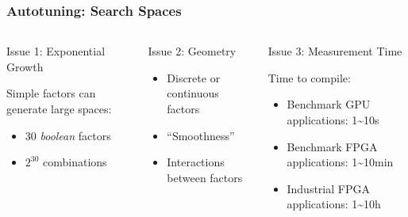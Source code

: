 \documentclass[10pt, compress, aspectratio=169, xcolor={table,usenames,dvipsnames}]{beamer}
\begin{document}
\begin{frame}
    \frametitle{Autotuning: Search Spaces}
    \begin{columns}[c]
            \begin{block}{Issue 1: \alert{Exponential Growth}}
                \vspace{.2cm}

                \alert{Simple factors} can generate \alert{large spaces}:

                \begin{itemize}
                    \item 30 \textit{boolean} factors
                    \item $2^{30}$ combinations
                \end{itemize}
            \end{block}

            \begin{block}{Issue 2: \alert{Geometry}}
                \begin{itemize}
                    \item \alert{Discrete} or \alert{continuous} factors
                    \item \alert{``Smoothness''}
                    \item \alert{Interactions} between factors
                \end{itemize}
            \end{block}

            \begin{block}{Issue 3: \alert{Measurement Time}}
                \vspace{.2cm}

                Time to \alert{compile}:

                \begin{itemize}
                    \item \alert{Benchmark} GPU applications:
                        \alert{1\textasciitilde10s}
                    \item \alert{Benchmark} FPGA applications:
                        \alert{1\textasciitilde10min}
                    \item \alert{Industrial} FPGA applications:
                        \alert{1\textasciitilde10h}
                \end{itemize}
            \end{block}

    \end{columns}
\end{frame}
\end{document}
